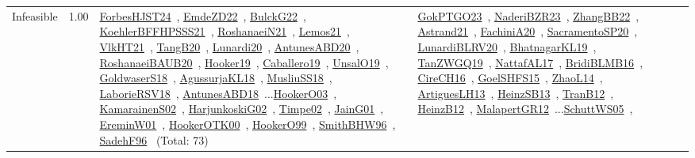 {\begin{longtable}{p{3cm}r>{\raggedright\arraybackslash}p{6cm}>{\raggedright\arraybackslash}p{6cm}>{\raggedright\arraybackslash}p{8cm}}
\index{Infeasible}\index{Concepts!Infeasible}Infeasible &  1.00 & \href{../works/ForbesHJST24.pdf}{ForbesHJST24}~\cite{ForbesHJST24}, \href{../works/EmdeZD22.pdf}{EmdeZD22}~\cite{EmdeZD22}, \href{../works/BulckG22.pdf}{BulckG22}~\cite{BulckG22}, \href{../works/KoehlerBFFHPSSS21.pdf}{KoehlerBFFHPSSS21}~\cite{KoehlerBFFHPSSS21}, \href{../works/RoshanaeiN21.pdf}{RoshanaeiN21}~\cite{RoshanaeiN21}, \href{../works/Lemos21.pdf}{Lemos21}~\cite{Lemos21}, \href{../works/VlkHT21.pdf}{VlkHT21}~\cite{VlkHT21}, \href{../works/TangB20.pdf}{TangB20}~\cite{TangB20}, \href{../works/Lunardi20.pdf}{Lunardi20}~\cite{Lunardi20}, \href{../works/AntunesABD20.pdf}{AntunesABD20}~\cite{AntunesABD20}, \href{../works/RoshanaeiBAUB20.pdf}{RoshanaeiBAUB20}~\cite{RoshanaeiBAUB20}, \href{../works/Hooker19.pdf}{Hooker19}~\cite{Hooker19}, \href{../works/Caballero19.pdf}{Caballero19}~\cite{Caballero19}, \href{../works/UnsalO19.pdf}{UnsalO19}~\cite{UnsalO19}, \href{../works/GoldwaserS18.pdf}{GoldwaserS18}~\cite{GoldwaserS18}, \href{../works/AgussurjaKL18.pdf}{AgussurjaKL18}~\cite{AgussurjaKL18}, \href{../works/MusliuSS18.pdf}{MusliuSS18}~\cite{MusliuSS18}, \href{../works/LaborieRSV18.pdf}{LaborieRSV18}~\cite{LaborieRSV18}, \href{../works/AntunesABD18.pdf}{AntunesABD18}~\cite{AntunesABD18}...\href{../works/HookerO03.pdf}{HookerO03}~\cite{HookerO03}, \href{../works/KamarainenS02.pdf}{KamarainenS02}~\cite{KamarainenS02}, \href{../works/HarjunkoskiG02.pdf}{HarjunkoskiG02}~\cite{HarjunkoskiG02}, \href{../works/Timpe02.pdf}{Timpe02}~\cite{Timpe02}, \href{../works/JainG01.pdf}{JainG01}~\cite{JainG01}, \href{../works/EreminW01.pdf}{EreminW01}~\cite{EreminW01}, \href{../works/HookerOTK00.pdf}{HookerOTK00}~\cite{HookerOTK00}, \href{../works/HookerO99.pdf}{HookerO99}~\cite{HookerO99}, \href{../works/SmithBHW96.pdf}{SmithBHW96}~\cite{SmithBHW96}, \href{../works/SadehF96.pdf}{SadehF96}~\cite{SadehF96} (Total: 73) & \href{../works/GokPTGO23.pdf}{GokPTGO23}~\cite{GokPTGO23}, \href{../works/NaderiBZR23.pdf}{NaderiBZR23}~\cite{NaderiBZR23}, \href{../works/ZhangBB22.pdf}{ZhangBB22}~\cite{ZhangBB22}, \href{../works/Astrand21.pdf}{Astrand21}~\cite{Astrand21}, \href{../works/FachiniA20.pdf}{FachiniA20}~\cite{FachiniA20}, \href{../works/SacramentoSP20.pdf}{SacramentoSP20}~\cite{SacramentoSP20}, \href{../works/LunardiBLRV20.pdf}{LunardiBLRV20}~\cite{LunardiBLRV20}, \href{../works/BhatnagarKL19.pdf}{BhatnagarKL19}~\cite{BhatnagarKL19}, \href{../works/TanZWGQ19.pdf}{TanZWGQ19}~\cite{TanZWGQ19}, \href{../works/NattafAL17.pdf}{NattafAL17}~\cite{NattafAL17}, \href{../works/BridiBLMB16.pdf}{BridiBLMB16}~\cite{BridiBLMB16}, \href{../works/CireCH16.pdf}{CireCH16}~\cite{CireCH16}, \href{../works/GoelSHFS15.pdf}{GoelSHFS15}~\cite{GoelSHFS15}, \href{../works/ZhaoL14.pdf}{ZhaoL14}~\cite{ZhaoL14}, \href{../works/ArtiguesLH13.pdf}{ArtiguesLH13}~\cite{ArtiguesLH13}, \href{../works/HeinzSB13.pdf}{HeinzSB13}~\cite{HeinzSB13}, \href{../works/TranB12.pdf}{TranB12}~\cite{TranB12}, \href{../works/HeinzB12.pdf}{HeinzB12}~\cite{HeinzB12}, \href{../works/MalapertGR12.pdf}{MalapertGR12}~\cite{MalapertGR12}...\href{../works/SchuttWS05.pdf}{SchuttWS05}~\cite{SchuttWS05}, 
\end{longtable}}
